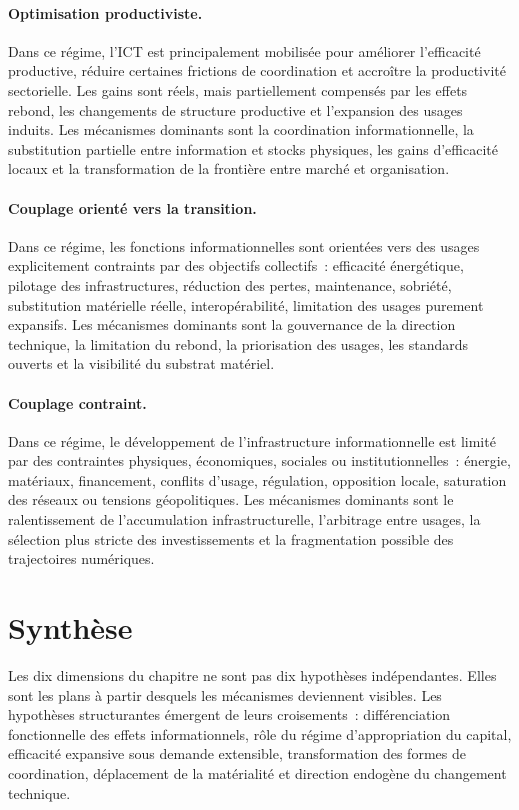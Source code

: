 \paragraph{Optimisation productiviste.}
Dans ce régime, l'ICT est principalement mobilisée pour améliorer l'efficacité productive, réduire certaines frictions de coordination et accroître la productivité sectorielle. Les gains sont réels, mais partiellement compensés par les effets rebond, les changements de structure productive et l'expansion des usages induits. Les mécanismes dominants sont la coordination informationnelle, la substitution partielle entre information et stocks physiques, les gains d'efficacité locaux et la transformation de la frontière entre marché et organisation.

\paragraph{Couplage orienté vers la transition.}
Dans ce régime, les fonctions informationnelles sont orientées vers des usages explicitement contraints par des objectifs collectifs~: efficacité énergétique, pilotage des infrastructures, réduction des pertes, maintenance, sobriété, substitution matérielle réelle, interopérabilité, limitation des usages purement expansifs. Les mécanismes dominants sont la gouvernance de la direction technique, la limitation du rebond, la priorisation des usages, les standards ouverts et la visibilité du substrat matériel.

\paragraph{Couplage contraint.}
Dans ce régime, le développement de l'infrastructure informationnelle est limité par des contraintes physiques, économiques, sociales ou institutionnelles~: énergie, matériaux, financement, conflits d'usage, régulation, opposition locale, saturation des réseaux ou tensions géopolitiques. Les mécanismes dominants sont le ralentissement de l'accumulation infrastructurelle, l'arbitrage entre usages, la sélection plus stricte des investissements et la fragmentation possible des trajectoires numériques.

\section{Synthèse}

Les dix dimensions du chapitre ne sont pas dix hypothèses indépendantes. Elles sont les plans à partir desquels les mécanismes deviennent visibles. Les hypothèses structurantes émergent de leurs croisements~: différenciation fonctionnelle des effets informationnels, rôle du régime d'appropriation du capital, efficacité expansive sous demande extensible, transformation des formes de coordination, déplacement de la matérialité et direction endogène du changement technique.

